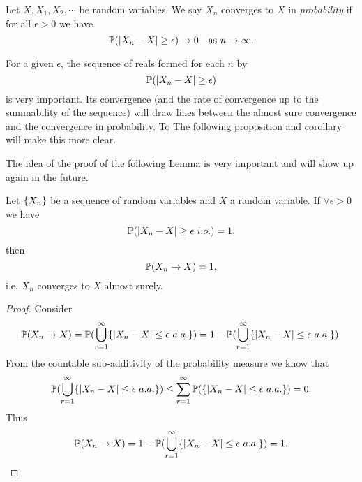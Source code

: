 \begin{definition}
	\label{def:convergInProb}
	Let $ X,X_1,X_2,\cdots $ be random variables. We say $ X_n $ converges to $ X $ in \emph{probability} if for all $ \epsilon>0 $ we have
	\[ \mathbb{P}(|X_n - X| \geq \epsilon) \to 0 \quad \text{as }  n\to\infty . \]
\end{definition}

\begin{observation}
	For a given $ \epsilon $, the sequence of reals formed for each $ n $ by
	\[ \mathbb{P}(|X_n - X| \geq \epsilon) \]
	is very important. Its convergence (and the rate of convergence up to the summability of the sequence) will draw lines between the almost sure convergence and the convergence in probability. To The following proposition and corollary will make this more clear. 
\end{observation}


The idea of the proof of the following Lemma is very important and will show up again in the future.
\begin{lemma}
	\label{prop:infiniteOftenThenAlmostSurely}
	Let $ \{X_n\} $ be a sequence of random variables and $ X $ a random variable. If $ \forall \epsilon>0 $ we have
	\[ \prob(\abs{X_n-X} \geq \epsilon\ i.o.) = 1, \]
	then 
	\[ \mathbb{P}(X_n \to X) = 1, \]
	i.e. $ X_n $ converges to $ X $ almost surely.
\end{lemma}
\begin{proof}
	Consider
	\[ \mathbb{P}(X_n\to X) = \mathbb{P}(\bigcup_{r=1}^\infty \{|X_n-X|\leq \epsilon\ a.a.\}) = 1 - \mathbb{P}(\bigcup_{r=1}^\infty \{|X_n-X|\leq \epsilon\ a.a.\} ). \]
	From the countable sub-additivity of the probability measure we know that
	\[ \mathbb{P}(\bigcup_{r=1}^\infty \{|X_n-X|\leq \epsilon\ a.a.\} ) \leq \sum_{r=1}^\infty\mathbb{P}(\{|X_n-X|\leq \epsilon\ a.a.\}) = 0. \]
	Thus
	\[ \mathbb{P}(X_n\to X) = 1 - \mathbb{P}(\bigcup_{r=1}^\infty \{|X_n-X|\leq \epsilon\ a.a.\} ) = 1. \]
\end{proof}

